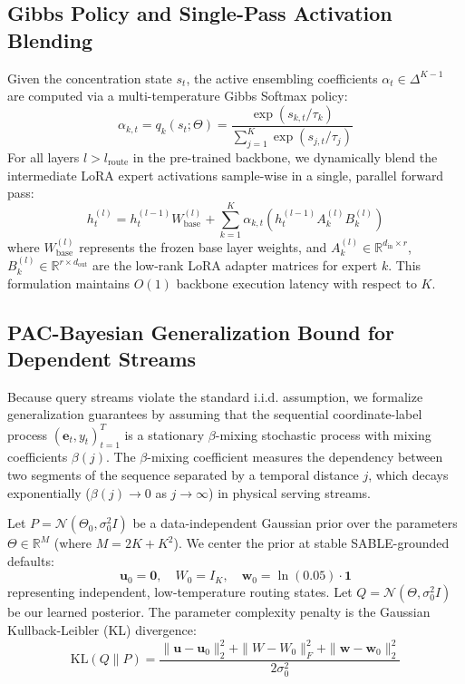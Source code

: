 \subsection{Gibbs Policy and Single-Pass Activation Blending}
\label{sec:policy_and_blending}
Given the concentration state $s_t$, the active ensembling coefficients $\alpha_t \in \Delta^{K-1}$ are computed via a multi-temperature Gibbs Softmax policy:
\begin{equation}
    \alpha_{k, t} = q_k(s_t; \Theta) = \frac{\exp(s_{k, t}/\tau_k)}{\sum_{j=1}^K \exp(s_{j, t}/\tau_j)}
\end{equation}
For all layers $l > l_{\text{route}}$ in the pre-trained backbone, we dynamically blend the intermediate LoRA expert activations sample-wise in a single, parallel forward pass:
\begin{equation}
    h_t^{(l)} = h_t^{(l-1)} W_{\text{base}}^{(l)} + \sum_{k=1}^K \alpha_{k, t} \left( h_t^{(l-1)} A_k^{(l)} B_k^{(l)} \right)
\end{equation}
where $W_{\text{base}}^{(l)}$ represents the frozen base layer weights, and $A_k^{(l)} \in \mathbb{R}^{d_{\text{in}} \times r}$, $B_k^{(l)} \in \mathbb{R}^{r \times d_{\text{out}}}$ are the low-rank LoRA adapter matrices for expert $k$. This formulation maintains $O(1)$ backbone execution latency with respect to $K$.

\subsection{PAC-Bayesian Generalization Bound for Dependent Streams}
\label{sec:pac_bound}
Because query streams violate the standard i.i.d. assumption, we formalize generalization guarantees by assuming that the sequential coordinate-label process $(\mathbf{e}_t, y_t)_{t=1}^T$ is a stationary $\beta$-mixing stochastic process with mixing coefficients $\beta(j)$. The $\beta$-mixing coefficient measures the dependency between two segments of the sequence separated by a temporal distance $j$, which decays exponentially ($\beta(j) \to 0$ as $j \to \infty$) in physical serving streams.

Let $P = \mathcal{N}(\Theta_0, \sigma_0^2 I)$ be a data-independent Gaussian prior over the parameters $\Theta \in \mathbb{R}^M$ (where $M = 2K + K^2$). We center the prior at stable SABLE-grounded defaults:
\begin{equation}
    \mathbf{u}_0 = \mathbf{0}, \quad W_0 = I_K, \quad \mathbf{w}_0 = \ln(0.05) \cdot \mathbf{1}
\end{equation}
representing independent, low-temperature routing states. Let $Q = \mathcal{N}(\Theta, \sigma_0^2 I)$ be our learned posterior. The parameter complexity penalty is the Gaussian Kullback-Leibler (KL) divergence:
\begin{equation}
    \text{KL}(Q \| P) = \frac{\|\mathbf{u} - \mathbf{u}_0\|_2^2 + \|W - W_0\|_F^2 + \|\mathbf{w} - \mathbf{w}_0\|_2^2}{2 \sigma_0^2}
\end{equation}

